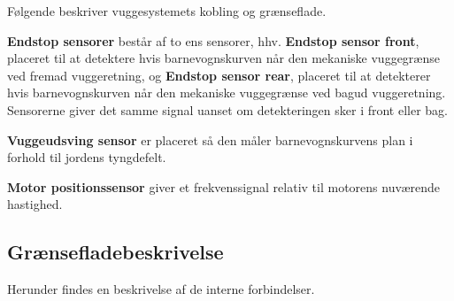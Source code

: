 Følgende beskriver vuggesystemets kobling og grænseflade.


\vspace{5mm} 

\textbf{Endstop sensorer} består af to ens sensorer, hhv. \textbf{Endstop sensor front}, placeret til at detektere hvis barnevognskurven når den mekaniske vuggegrænse ved fremad vuggeretning, og \textbf{Endstop sensor rear}, placeret til at detekterer hvis barnevognskurven når den mekaniske vuggegrænse ved bagud vuggeretning. Sensorerne giver det samme signal uanset om detekteringen sker i front eller bag.

\vspace{5mm}

\textbf{Vuggeudsving sensor} er placeret så den måler barnevognskurvens plan i forhold til jordens tyngdefelt. 

\vspace{5mm}

\textbf{Motor positionssensor} giver et frekvenssignal relativ til motorens nuværende hastighed. 

\subsection{Grænsefladebeskrivelse}
Herunder findes en beskrivelse af de interne forbindelser. 

